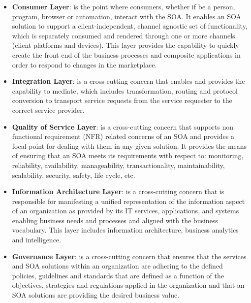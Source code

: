 \documentclass[10pt,a4paper]{article}
\begin{document}
\begin{itemize}
	\item \textbf{Consumer Layer}: is the point where consumers, whether if be a person, program, browser or automation, interact with the SOA. It enables an SOA solution to support a client-independent, channel agnostic set of functionality, which is separately consumed and rendered through one or more channels (client platforms and devices). This layer provides the capability to quickly create the front end of the business processes and composite applications in order to respond to changes in the marketplace.
	\item \textbf{Integration Layer}:  is a cross-cutting concern that enables and provides the capability to mediate, which includes transformation, routing and protocol conversion to transport service requests from the service requester to the correct service provider.
	\item \textbf{Quality of Service Layer}: is a cross-cutting concern that supports non functional requirement (NFR) related concerns of an SOA and provides a focal point for dealing with them in any given solution. It provides the means of ensuring that an SOA meets its requirements with respect to: monitoring, reliability, availability, manageability, transactionality, maintainability, scalability, security, safety, life cycle, etc.
	\item \textbf{Information Architecture Layer}: is a cross-cutting concern that is responsible for manifesting a unified representation of the information aspect of an organization as provided by its IT services, applications, and systems enabling business needs and processes and aligned with the business vocabulary. This layer includes information architecture, business analytics and intelligence.
	\item \textbf{Governance Layer}: is a cross-cutting concern that ensures that the services and SOA solutions within an organization are adhering to the defined policies, guidelines and standards that are defined as a function of the objectives, strategies and regulations applied in the organization and that an SOA solutions are providing the desired business value.
\end{itemize}
\end{document}
